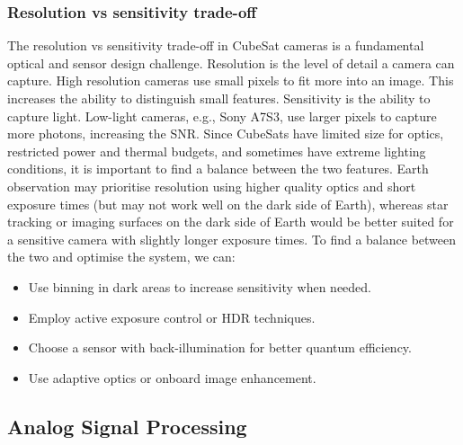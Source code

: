 \documentclass[10pt]{article}
\begin{document}
\begin{multicols}{2}
\subsubsection{Resolution vs sensitivity trade-off}
The resolution vs sensitivity trade-off in CubeSat cameras is a fundamental optical and sensor design challenge.
\newline
Resolution is the level of detail a camera can capture. High resolution cameras use small pixels to fit more into an image. This increases the ability to distinguish small features.
\newline
Sensitivity is the ability to capture light. Low-light cameras, e.g., Sony A7S3, use larger pixels to capture more photons, increasing the SNR.
\newline
Since CubeSats have limited size for optics, restricted power and thermal budgets, and sometimes have extreme lighting conditions, it is important to find a balance between the two features.
Earth observation may prioritise resolution using higher quality optics and short exposure times (but may not work well on the dark side of Earth), whereas star tracking or imaging surfaces on the dark side of Earth would be better suited for a sensitive camera with slightly longer exposure times.
\newline \newline
To find a balance between the two and optimise the system, we can:
\begin{itemize}
    \item Use binning in dark areas to increase sensitivity when needed.
    \item Employ active exposure control or HDR techniques.
    \item Choose a sensor with back-illumination for better quantum efficiency.
    \item Use adaptive optics or onboard image enhancement.
\end{itemize}

\subsection{Analog Signal Processing}

\end{multicols}
\end{document}
